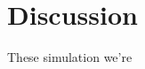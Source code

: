 \documentclass{article}
\begin{document}

\section{Discussion}


These simulation we're


{}

\end{document}
